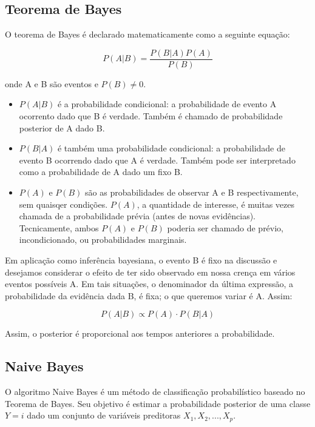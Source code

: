 \documentclass{article}
\begin{document}
\subsection{Teorema de Bayes}

O teorema de Bayes é declarado matematicamente como a seguinte equação:

\begin{equation}
    P(A|B) = \frac{P(B|A)P(A)}{P(B)}
\end{equation}

onde A e B são eventos e $P(B) \neq 0$.

\begin{itemize}
    \item $P(A|B)$ é a probabilidade condicional: a probabilidade de evento A ocorrento
    dado que B é verdade. Também é chamado de probabilidade posterior de A dado B.
    \item $P(B|A)$ é também uma probabilidade condicional: a probabilidade de evento B 
    ocorrendo dado que A é verdade. Também pode ser interpretado como a probabilidade de A dado
    um fixo B.
    \item $P(A)$ e $P(B)$ são as probabilidades de observar A e B respectivamente, sem 
    quaisqer condições. $P(A)$, a quantidade de interesse, é muitas vezes chamada de a 
    probabilidade prévia (antes de novas evidências). Tecnicamente, ambos $P(A)$ e $P(B)$
    poderia ser chamado de prévio, incondicionado, ou probabilidades marginais.
\end{itemize}

Em aplicação como inferência bayesiana, o evento B é fixo na discussão e desejamos 
considerar o efeito de ter sido observado em nossa crença em vários eventos possíveis 
A. Em tais situações, o denominador da última expressão, a probabilidade da evidência 
dada B, é fixa; o que queremos variar é A. Assim:

\begin{equation}
    P(A|B) \propto P(A) \cdot P(B|A)
\end{equation}

Assim, o posterior é proporcional aos tempos anteriores a probabilidade.

\subsection{Naive Bayes}

O algoritmo Naive Bayes é um método de classificação probabilístico baseado
no Teorema de Bayes. Seu objetivo é estimar a probabilidade posterior de uma classe
$Y = i$ dado um conjunto de variáveis preditoras $X_1, X_2, ..., X_p$.
\end{document}
